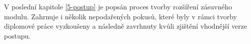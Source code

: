 V poslední kapitole \ref{5-postup} je popsán proces tvorby rozšíření zásuvného modulu.
Zahrnuje i několik nepodařených pokusů, které byly v rámci tvorby diplomové práce vyzkoušeny a následně zavrhnuty 
kvůli zjištění vhodnější verze postupu.
 
% 
% 
% 
% 



                     